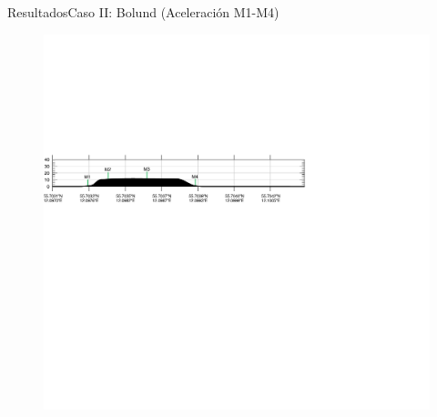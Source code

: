 \documentclass[mathserif,10pt]{beamer}
\begin{document}
\begin{frame}{Resultados}{Caso II: Bolund (Aceleración M1-M4)}
\begin{figure}[H]
		\includegraphics[width=0.65\linewidth,trim={-11mm 193mm 115mm 112mm},clip]{fig/06/bol/cross_height}\\%
		\label{fig:06_bol_speedup}
	\end{figure}
\end{frame}
\end{document}
